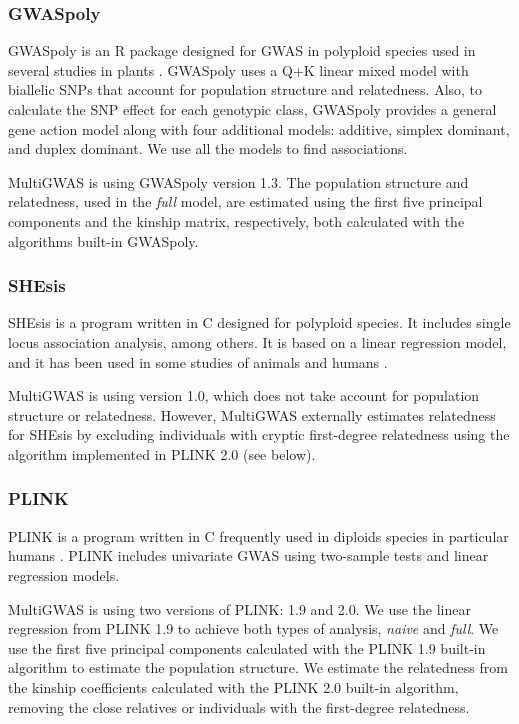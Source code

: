 \documentclass{article}
\begin{document}
\subsubsection{GWASpoly}

GWASpoly \cite{Rosyara2016} is an R package designed for GWAS in polyploid species used in several studies in plants \cite{Berdugo2017,Ferrao2018,Sharma2018,Yuan2019}. GWASpoly uses a Q+K linear mixed model with biallelic SNPs that account for population structure and relatedness. Also, to calculate the SNP effect for each genotypic class, GWASpoly provides a general gene action model along with four additional models: additive, simplex dominant, and duplex dominant. We use all the models to find associations.

MultiGWAS is using GWASpoly version 1.3. The population structure and relatedness, used in the \emph{full} model, are estimated using the first five principal components and the kinship matrix, respectively, both calculated with the algorithms built-in GWASpoly.  


\subsubsection{SHEsis}

SHEsis \cite{Shen2016} is a program written in C designed for polyploid species. It includes single locus association analysis, among others. It is based on a linear regression model, and it has been used in some studies of animals and humans \cite{Qiao2015,Meng2019}. 

MultiGWAS is using version 1.0, which does not take account for population structure or relatedness. However, MultiGWAS externally estimates relatedness for SHEsis by excluding individuals with cryptic first-degree relatedness using the algorithm implemented in PLINK 2.0 (see below).


\subsubsection{PLINK}

PLINK \cite{Purcell2007} is a program written in C frequently used in diploids species in particular humans \cite{Power2016}. PLINK includes univariate GWAS using two-sample tests and linear regression models.

MultiGWAS is using two versions of PLINK: 1.9 and 2.0. We use the linear regression from PLINK 1.9 to achieve both types of analysis, \emph{naive} and \emph{full}. We use the first five principal components calculated with the PLINK 1.9 built-in algorithm to estimate the population structure. We estimate the relatedness from the kinship coefficients calculated with the PLINK 2.0 built-in algorithm, removing the close relatives or individuals with the first-degree relatedness.
\end{document}
